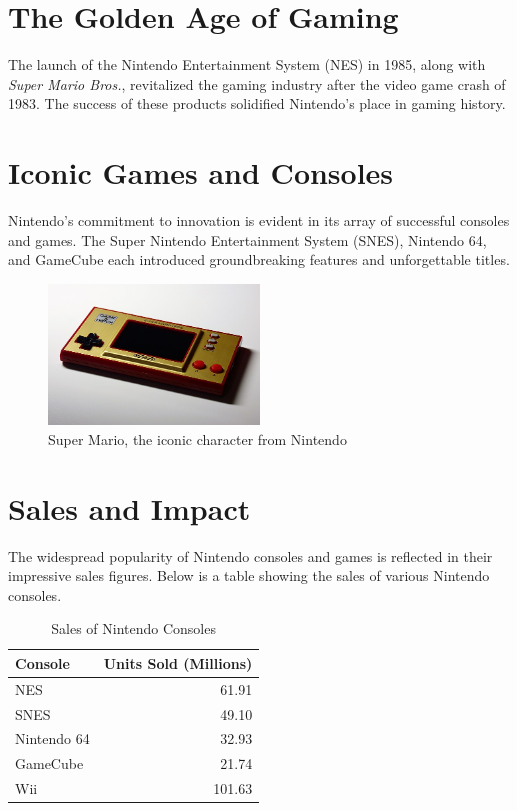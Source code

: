 \documentclass{article}
\begin{document}
\section{The Golden Age of Gaming}

The launch of the Nintendo Entertainment System (NES) in 1985, along with \textit{Super Mario Bros.}, revitalized the gaming industry after the video game crash of 1983\cite{superMarioBros}. The success of these products solidified Nintendo's place in gaming history.

\section{Iconic Games and Consoles}

Nintendo's commitment to innovation is evident in its array of successful consoles and games. The Super Nintendo Entertainment System (SNES), Nintendo 64, and GameCube each introduced groundbreaking features and unforgettable titles\cite{nintendoConsoles}.

\begin{figure}[h]
\centering
\includegraphics[width=0.5\textwidth]{super_mario.png}
\caption{Super Mario, the iconic character from Nintendo}
\label{fig:super-mario}
\end{figure}

\section{Sales and Impact}

The widespread popularity of Nintendo consoles and games is reflected in their impressive sales figures. Below is a table showing the sales of various Nintendo consoles\cite{nintendoSales}.

\begin{table}[h]
\centering
\begin{tabular}{|l|r|}
\hline
\textbf{Console} & \textbf{Units Sold (Millions)} \\
\hline
NES & 61.91 \\
SNES & 49.10 \\
Nintendo 64 & 32.93 \\
GameCube & 21.74 \\
Wii & 101.63 \\
\hline
\end{tabular}
\caption{Sales of Nintendo Consoles}
\label{tab:nintendo-sales}
\end{table}
\end{document}

